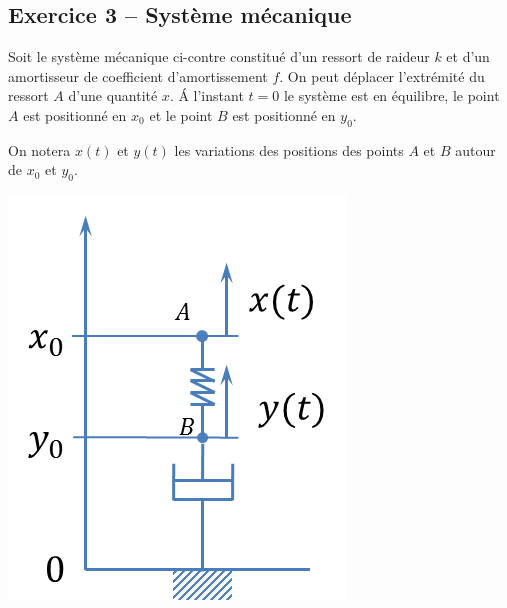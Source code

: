 \documentclass[11pt,oneside]{article}
\begin{document}
\subsection*{Exercice 3 -- Système mécanique}
\setcounter{subparagraph}{0}
\begin{minipage}[c]{.6\linewidth}
Soit le système mécanique ci-contre constitué d'un ressort de raideur $k$ et d'un amortisseur de coefficient d'amortissement $f$. On peut déplacer l'extrémité du ressort $A$ d'une quantité $x$. \'A l'instant $t=0$ le système est en équilibre, le point $A$ est positionné en $x_0$ et le point $B$ est positionné en $y_0$. 

On notera $x(t)$ et $y(t)$ les variations des positions des points $A$ et $B$ autour de $x_0$ et $y_0$.


\end{minipage}\hfill
\begin{minipage}[c]{.35\linewidth}
\begin{center}
\includegraphics[width=.9\textwidth]{png/systeme_meca}
\end{center}
\end{minipage}
\end{document}
